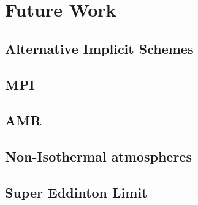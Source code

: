 \section{Future Work}

\subsection{Alternative Implicit Schemes}
\subsection{MPI}
\subsection{AMR}
\subsection{Non-Isothermal atmospheres}
\subsection{Super Eddinton Limit}